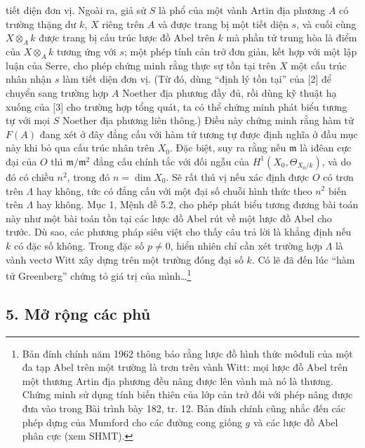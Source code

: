 \documentclass[11pt,twoside,openany]{book}
\numberwithin{equation}{section}
\newcommand{\src}[1]{%
  \phantomsection\hypertarget{src:\fgasourceid:#1}{}%
  \marginpar{\raggedleft\footnotesize\sffamily #1}%
}
\newcommand{\fgasourceid}{unset}
\begin{document}
\src{387}
tiết diện đơn vị. Ngoài ra, giả sử $S$ là phổ của một vành Artin địa phương
$A$ có trường thặng dư $k$, $X$ riêng trên $A$ và được trang bị một tiết diện
$s$, và cuối cùng $X\otimes_Ak$ được trang bị cấu trúc lược đồ Abel trên $k$
mà phần tử trung hòa là điểm của $X\otimes_Ak$ tương ứng với $s$; một phép
tính cản trở đơn giản, kết hợp với một lập luận của Serre, cho phép chứng minh
rằng thực sự tồn tại trên $X$ một cấu trúc nhân nhận $s$ làm tiết diện đơn vị.
(Từ đó, dùng ``định lý tồn tại'' của [2] để chuyển sang trường hợp $A$ Noether
địa phương đầy đủ, rồi dùng kỹ thuật hạ xuống của [3] cho trường hợp tổng quát,
ta có thể chứng minh phát biểu tương tự với mọi $S$ Noether địa phương liên
thông.) Điều này chứng minh rằng hàm tử $F(A)$ đang xét ở đây đẳng cấu với hàm
tử tương tự được định nghĩa ở đầu mục này khi bỏ qua cấu trúc nhân trên $X_0$.
Đặc biệt, suy ra rằng nếu $\mathfrak m$ là iđêan cực đại của $O$ thì
$\mathfrak m/\mathfrak m^2$ đẳng cấu chính tắc với đối ngẫu của
$H^1(X_0,\Theta_{X_0/k})$, và do đó có chiều $n^2$, trong đó
$n=\dim X_0$. Sẽ rất thú vị nếu xác định được $O$ có trơn trên $\Lambda$ hay
không, tức có đẳng cấu với một đại số chuỗi hình thức theo $n^2$ biến trên
$\Lambda$ hay không. Mục 1, Mệnh đề 5.2, cho phép phát biểu tương đương bài
toán này như một bài toán tồn tại các lược đồ Abel rút về một lược đồ Abel cho
trước. Dù sao, các phương pháp siêu việt cho thấy câu trả lời là khẳng định nếu
$k$ có đặc số không. Trong đặc số $p\ne0$, hiển nhiên chỉ cần xét trường hợp
$\Lambda$ là vành vectơ Witt xây dựng trên một trường đóng đại số $k$. Có lẽ
đã đến lúc ``hàm tử Greenberg'' chứng tỏ giá trị của mình\ldots\footnote{Bản
đính chính năm 1962 thông báo rằng lược đồ hình thức môđuli của một đa tạp Abel
trên một trường là trơn trên vành Witt: mọi lược đồ Abel trên một thương Artin
địa phương đều nâng được lên vành mà nó là thương. Chứng minh sử dụng tính
biến thiên của lớp cản trở đối với phép nâng được đưa vào trong Bài trình bày
182, tr. 12. Bản đính chính cũng nhắc đến các phép dựng của Mumford cho các
đường cong giống $g$ và các lược đồ Abel phân cực (xem SHMT).}

\subsection*{5. Mở rộng các phủ}
\end{document}
